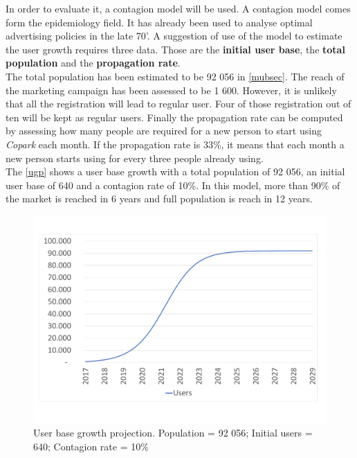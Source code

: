 \documentclass[12pt,a4paper,oneside]{book}
\newcommand{\bp}{\textit{Copark }}
\begin{document}
In order to evaluate it, a contagion model will be used. A contagion model comes form the epidemiology field. It has already been used to analyse optimal advertising policies in the late 70'.\cite{sethi1979optimal} A suggestion of use of the model to estimate the user growth requires three data. Those are the \textbf{initial user base}, the \textbf{total population} and the \textbf{propagation rate}.\cite{cmep}\\

The total population has been estimated to be 92 056 in \autoref{mubsec}. The reach of the marketing campaign has been assessed to be 1 600. However, it is unlikely that all the registration will lead to regular user. Four of those registration out of ten will be kept as regular users. Finally the propagation rate can be computed by assessing how many people are required for a new person to start using \bp each month. If the propagation rate is 33\%, it means that each month a new person starts using for every three people already using.\\

The \autoref{ugp} shows a user base growth with a total population of 92 056, an initial user base of 640 and a contagion rate of 10\%. In this model, more than 90\% of the market is reached in 6 years and full population is reach in 12 years.\\

\begin{figure}[h]
\centering
\caption{User base growth projection. Population = 92 056; Initial users = 640; Contagion rate = 10\%}
\label{ugp}
\includegraphics[keepaspectratio=true,width=\textwidth-2cm]{../graph/usergrowth.pdf}
\end{figure}
\end{document}
